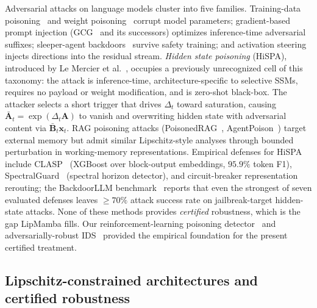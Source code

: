 \documentclass[journal,a4paper,10pt]{IEEEtran}
\theoremstyle{definition}
\theoremstyle{remark}
\newcommand{\modelname}{LipMamba}
\begin{document}
Adversarial attacks on language models cluster into five families. Training-data poisoning~\cite{gu2017badnets,chen2017targeted} and weight poisoning~\cite{kurita2020weight} corrupt model parameters; gradient-based prompt injection (GCG~\cite{zou2023universal} and its successors) optimizes inference-time adversarial suffixes; sleeper-agent backdoors~\cite{hubinger2024sleeper} survive safety training; and activation steering~\cite{zou2023repe,wang2024trojan} injects directions into the residual stream. \emph{Hidden state poisoning} (HiSPA), introduced by Le Mercier et al.~\cite{lemercier2026hispa}, occupies a previously unrecognized cell of this taxonomy: the attack is inference-time, architecture-specific to selective SSMs, requires no payload or weight modification, and is zero-shot black-box. The attacker selects a short trigger that drives $\Delta_t$ toward saturation, causing $\bar{\mathbf{A}}_t = \exp(\Delta_t \mathbf{A})$ to vanish and overwriting hidden state with adversarial content via $\bar{\mathbf{B}}_t \mathbf{x}_t$. RAG poisoning attacks (PoisonedRAG~\cite{zou2025poisonedrag}, AgentPoison~\cite{chen2024agentpoison}) target external memory but admit similar Lipschitz-style analyses through bounded perturbation in working-memory representations. Empirical defenses for HiSPA include CLASP~\cite{lemercier2026clasp} (XGBoost over block-output embeddings, $95.9\%$ token F1), SpectralGuard~\cite{lemercier2026spectralguard} (spectral horizon detector), and circuit-breaker representation rerouting; the BackdoorLLM benchmark~\cite{li2025backdoorllm} reports that even the strongest of seven evaluated defenses leaves $\geq 70\%$ attack success rate on jailbreak-target hidden-state attacks. None of these methods provides \emph{certified} robustness, which is the gap \modelname{} fills. Our reinforcement-learning poisoning detector~\cite{anaedevha2025dqn} and adversarially-robust IDS~\cite{anaedevha2024adversarial} provided the empirical foundation for the present certified treatment.

\subsection{Lipschitz-constrained architectures and certified robustness}
\end{document}
